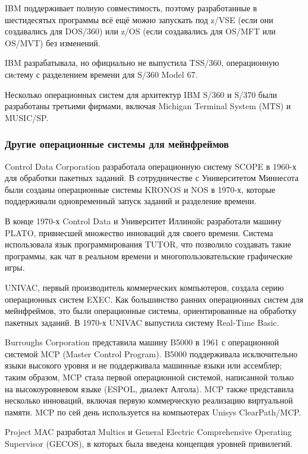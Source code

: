IBM поддерживает полную совместимость, поэтому разработанные в шестидесятых программы всё ещё можно запускать под z/VSE (если они создавались для DOS/360) или z/OS (если создавались для OS/MFT или OS/MVT) без изменений.

IBM разрабатывала, но официально не выпустила TSS/360, операционную сиcтему с разделением времени для S/360 Model 67.

Несколько операционных систем для архитектур IBM S/360 и S/370 были разработаны третьими фирмами, включая Michigan Terminal System (MTS) и MUSIC/SP.

\subsubsection{Другие операционные системы для мейнфреймов}\label{base:os:history:other}
Control Data Corporation разработала операционную систему SCOPE в 1960-х для обработки пакетных заданий. В сотрудничестве с Университетом Миннесота были созданы операционные системы KRONOS и NOS в 1970-х, которые поддерживали одновременный запуск заданий и разделение времени.

В конце 1970-х Control Data и Университет Иллинойс разработали машину PLATO, привнесшей множество инноваций для своего времени. Система использовала язык программирования TUTOR, что позволило создавать такие программы, как чат в реальном времени и многопользовательские графические игры.

UNIVAC, первый производитель коммерческих компьютеров, создала серию операционных систем EXEC. Как большинство ранних операционных систем для мейнфреймов, это были операционные системы, ориентированные на обработку пакетных заданий. В 1970-х UNIVAC выпустила систему Real-Time Basic.

Burroughs Corporation представила машину B5000 в 1961 с операционной системой MCP (Master Control Program). B5000 поддерживала исключительно языки высокого уровня и не поддерживала машинные языки или ассемблер; таким образом, MCP стала первой операционной системой, написанной только на высокоуровневом языке (ESPOL, диалект Алгола). MCP также представила несколько инноваций, включая первую коммерческую реализацию виртуальной памяти. MCP по сей день используется на компьютерах Unisys ClearPath/MCP.

Project MAC разработал Multics и  General Electric Comprehensive Operating Supervisor (GECOS),  в которых была введена концепция уровней привилегий.


